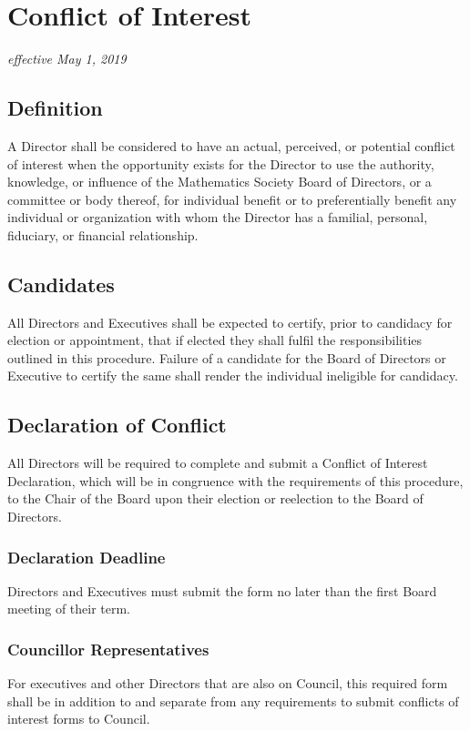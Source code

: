 \section{Conflict of Interest}
\emph{effective May 1, 2019}

\subsection{Definition}
A Director shall be considered to have an actual, perceived, or potential conflict of interest when the opportunity exists for the Director to use the authority, knowledge, or influence of the Mathematics Society Board of Directors, or a committee or body thereof, for individual benefit or to preferentially benefit any individual or organization with whom the Director has a familial, personal, fiduciary, or financial relationship.

\subsection{Candidates}
All Directors and Executives shall be expected to certify, prior to candidacy for election or appointment, that if elected they shall fulfil the responsibilities outlined in this procedure. Failure of a candidate for the Board of Directors or Executive to certify the same shall render the individual ineligible for candidacy.

\subsection{Declaration of Conflict}
All Directors will be required to complete and submit a Conflict of Interest Declaration, which will be in congruence with the requirements of this procedure, to the Chair of the Board upon their election or reelection to the Board of Directors. 

\subsubsection{Declaration Deadline}
Directors and Executives must submit the form no later than the first Board meeting of their term.

\subsubsection{Councillor Representatives}
For executives and other Directors that are also on Council, this required form shall be in addition to and separate from any requirements to submit conflicts of interest forms to Council.

